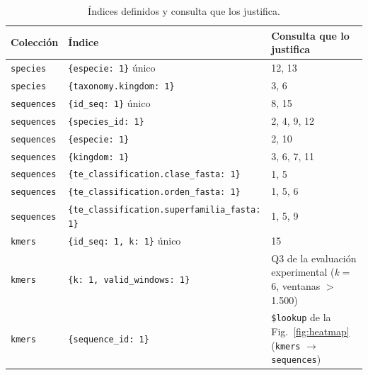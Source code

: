 \documentclass[journal]{IEEEtran}
\begin{document}
\begin{table}[t]
\caption{Índices definidos y consulta que los justifica.}
\label{tab:indices}
\centering
\footnotesize
\begin{tabularx}{\textwidth}{@{}l l X@{}}
\toprule
Colección & Índice & Consulta que lo justifica \\
\midrule
\texttt{species} & \texttt{\{especie: 1\}} único & 12, 13 \\
\texttt{species} & \texttt{\{taxonomy.kingdom: 1\}} & 3, 6 \\
\texttt{sequences} & \texttt{\{id\_seq: 1\}} único & 8, 15 \\
\texttt{sequences} & \texttt{\{species\_id: 1\}} & 2, 4, 9, 12 \\
\texttt{sequences} & \texttt{\{especie: 1\}} & 2, 10 \\
\texttt{sequences} & \texttt{\{kingdom: 1\}} & 3, 6, 7, 11 \\
\texttt{sequences} & \texttt{\{te\_classification.\allowbreak clase\_fasta: 1\}} & 1, 5 \\
\texttt{sequences} & \texttt{\{te\_classification.\allowbreak orden\_fasta: 1\}} & 1, 5, 6 \\
\texttt{sequences} & \texttt{\{te\_classification.\allowbreak superfamilia\_fasta: 1\}} & 1, 5, 9 \\
\texttt{kmers} & \texttt{\{id\_seq: 1, k: 1\}} único & 15 \\
\texttt{kmers} & \texttt{\{k: 1, valid\_windows: 1\}} & Q3 de la evaluación experimental (\textit{k} = 6, ventanas $>$ 1.500) \\
\texttt{kmers} & \texttt{\{sequence\_id: 1\}} & \texttt{\$lookup} de la Fig.~\ref{fig:heatmap} (\texttt{kmers} $\rightarrow$ \texttt{sequences}) \\
\bottomrule
\end{tabularx}
\end{table}
\end{document}
